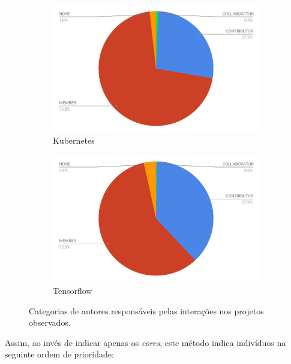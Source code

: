 \documentclass[12pt,openany,oneside,a4paper,english,brazil]{abntbibufjf}
\begin{document}
\begin{figure}[htbp]
\begin{subfigure}[b]{0.475\textwidth}
           \includegraphics[width=\textwidth]{resultados/dist-author-type-kubernetes}

           \caption[Kubernetes]%
           {{\small Kubernetes}}
           \label{fig:dist-author-type-kubernetes}
       \end{subfigure}
       \quad
       \begin{subfigure}[b]{0.475\textwidth}
           \centering
           \includegraphics[width=\textwidth]{resultados/dist-author-type-tensorflow}
           \caption[Tensorflow]%
           {{\small Tensorflow}}
           \label{fig:dist-author-type-tensorflow}
       \end{subfigure}
       \caption[]
       {\small Categorias de autores responsáveis pelas interações nos projetos observados.}
       \label{fig:dist-author-type}
   \end{figure}


Assim, ao invés de indicar apenas os \textit{cores}, este método indica indivíduos na seguinte ordem de prioridade:
\end{document}
